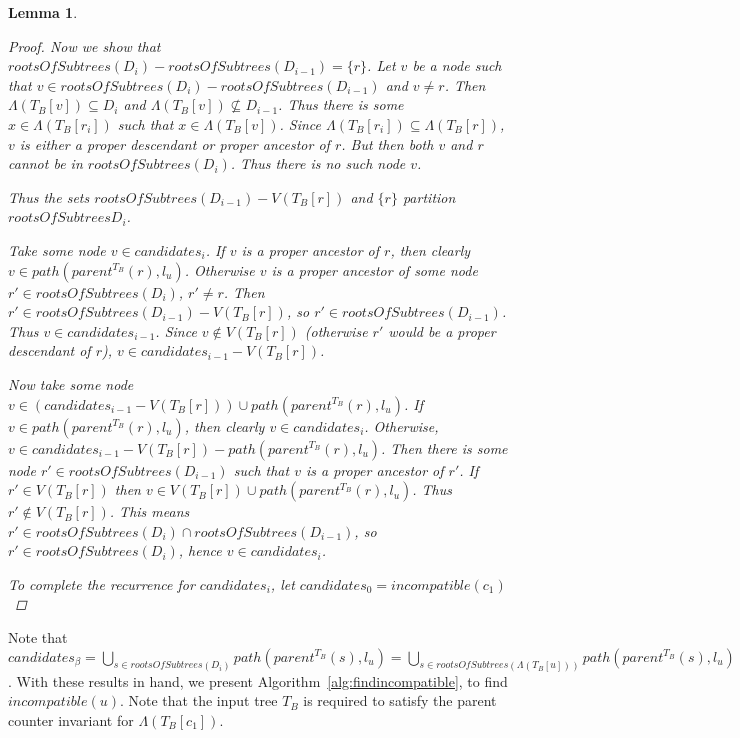 \documentclass{article}
\newcommand{\leafset}{\Lambda}
\newtheorem{incompatiblecandidates}[incompatibility]{Lemma}
\begin{document}
\begin{incompatiblecandidates}
\begin{proof}
            Now we show that $rootsOfSubtrees(D_i) - rootsOfSubtrees(D_{i-1}) = \{r\}$. Let $v$ be a node such that $v \in rootsOfSubtrees(D_i) - rootsOfSubtrees(D_{i-1})$ and $v \neq r$. Then $\leafset(T_B[v]) \subseteq D_i$ and $\leafset(T_B[v]) \not\subseteq D_{i-1}$. Thus there is some $x \in \leafset(T_B[r_i])$ such that $x \in \leafset(T_B[v])$. Since $\leafset(T_B[r_i]) \subseteq \leafset(T_B[r])$, $v$ is either a proper descendant or proper ancestor of $r$. But then both $v$ and $r$ cannot be in $rootsOfSubtrees(D_i)$. Thus there is no such node $v$.

            Thus the sets $rootsOfSubtrees(D_{i-1}) - V(T_B[r])$ and $\{r\}$ partition $rootsOfSubtrees{D_i}$.

            Take some node $v \in candidates_i$. If $v$ is a proper ancestor of $r$, then clearly $v \in path(parent^{T_B}(r), l_u)$. Otherwise $v$ is a proper ancestor of some node $r' \in rootsOfSubtrees(D_i)$, $r' \neq r$. Then $r' \in rootsOfSubtrees(D_{i-1}) - V(T_B[r])$, so $r' \in rootsOfSubtrees(D_{i-1})$. Thus $v \in candidates_{i-1}$. Since $v \not\in V(T_B[r])$ (otherwise $r'$ would be a proper descendant of $r$), $v \in candidates_{i-1} - V(T_B[r])$.

            Now take some node $v \in (candidates_{i-1} - V(T_B[r])) \cup path(parent^{T_B}(r), l_u)$. If $v \in path(parent^{T_B}(r), l_u)$, then clearly $v \in candidates_i$. Otherwise, $v \in candidates_{i-1} - V(T_B[r]) - path(parent^{T_B}(r), l_u)$. Then there is some node $r' \in rootsOfSubtrees(D_{i-1})$ such that $v$ is a proper ancestor of $r'$. If $r' \in V(T_B[r])$ then $v \in V(T_B[r]) \cup path(parent^{T_B}(r), l_u)$. Thus $r' \not\in V(T_B[r])$. This means $r' \in rootsOfSubtrees(D_i) \cap rootsOfSubtrees(D_{i-1})$, so $r' \in rootsOfSubtrees(D_i)$, hence $v \in candidates_i$.

            To complete the recurrence for $candidates_i$, let $candidates_0 = incompatible(c_1)$
        \end{proof}
    \end{incompatiblecandidates}

    Note that $candidates_{\beta} = \bigcup_{s \in rootsOfSubtrees(D_i)} path(parent^{T_B}(s), l_u) = \bigcup_{s \in rootsOfSubtrees(\leafset(T_B[u]))} path(parent^{T_B}(s), l_u) = incompatible(u)$. With these results in hand, we present Algorithm~\ref{alg:findincompatible}, to find $incompatible(u)$. Note that the input tree $T_B$ is required to satisfy the parent counter invariant for $\leafset(T_B[c_1])$.
\end{document}
